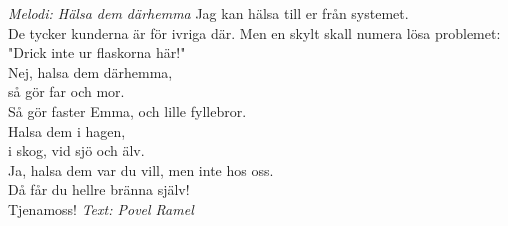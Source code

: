 {\footnotesize\textit{Melodi: Hälsa dem därhemma}}
\vspace{10pt}
Jag kan hälsa till er från systemet.\\
De tycker kunderna är för ivriga där.
Men en skylt skall numera lösa problemet:\\
"Drick inte ur flaskorna här!"\\
Nej, halsa dem därhemma,\\
så gör far och mor.\\
Så gör faster Emma, och lille fyllebror.\\
Halsa dem i hagen,\\
i skog, vid sjö och älv.\\
Ja, halsa dem var du vill, men inte hos oss.\\
Då får du hellre bränna själv!\\
Tjenamoss!
\vspace{10pt}
{\footnotesize\textit{Text: Povel Ramel}}

